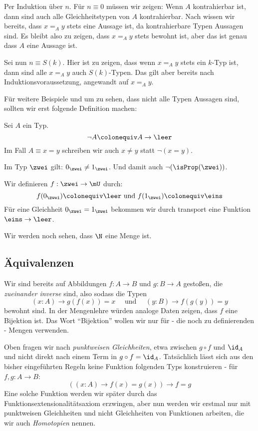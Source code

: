 \begin{beweis}
  Per Induktion über $n$.
  Für $n\equiv 0$ müssen wir zeigen: Wenn $A$ kontrahierbar ist, dann sind auch alle Gleichheitstypen von $A$ kontrahierbar.
  Nach  wissen wir bereits, dass $x=_Ay$ stets eine Aussage ist,
  da kontrahierbare Typen Aussagen sind.
  Es bleibt also zu zeigen, dass $x=_Ay$ stets bewohnt ist, aber das ist genau dass $A$ eine Aussage ist.

  Sei nun $n\equiv S(k)$. Hier ist zu zeigen, dass wenn $x=_Ay$ stets ein $k$-Typ ist,
  dann sind alle $x=_Ay$ auch $S(k)$-Typen. Das gilt aber bereits nach Induktionsvoraussetzung, angewandt auf $x=_Ay$.
\end{beweis}

Für weitere Beispiele und um zu sehen, dass nicht alle Typen Aussagen sind, sollten wir erst folgende Definition machen:

\begin{definition}
  Sei $A$ ein Typ.
  \[
    \neg A\colonequiv A\to\leer
    \]
    Im Fall $A\equiv x=y$ schreiben wir auch $x\neq y$ statt $\neg(x=y)$.
\end{definition}

\begin{bemerkung}
  Im Typ $\zwei$ gilt: $0_\zwei\neq 1_\zwei$. Und damit auch $\neg(\isProp(\zwei))$.
\end{bemerkung}
\begin{beweis}
  Wir definieren $f:\zwei\to\mU$ durch:
  \[
    f(0_\zwei)\colonequiv \leer\text{ und }f(1_\zwei)\colonequiv \eins
    \]
    Für eine Gleichheit $0_\zwei=1_\zwei$ bekommen wir durch transport eine Funktion $\eins\to\leer$.
\end{beweis}

Wir werden noch sehen, dass $\N$ eine Menge ist.

\subsection{Äquivalenzen}

Wir sind bereits auf Abbildungen $f:A\to B$ und $g:B\to A$ gestoßen, die \emph{zueinander inverse} sind, also sodass die Typen
\[
  (x:A)\to g(f(x))=x\quad \text{ und }\quad (y:B)\to f(g(y))=y 
\]
bewohnt sind.
In der Mengenlehre würden analoge Daten zeigen, dass $f$ eine Bijektion ist.
Das Wort ``Bijektion'' wollen wir nur für - die noch zu definierenden - Mengen verwenden.

Oben fragen wir nach \emph{punktweisen Gleichheiten}, etwa zwischen $g\circ f$ und $\id_A$ und
nicht direkt nach einem Term in $g\circ f = \id_A$.
Tatsächlich lässt sich aus den bisher eingeführten Regeln keine Funktion folgenden Typs konstruieren - für $f,g:A\to B$:
\[
  ((x:A)\to f(x)=g(x))\to f=g
\]
Eine solche Funktion werden wir später durch das Funktionsextensionalitätsaxiom erzwingen,
aber nun werden wir erstmal nur mit punktweisen Gleichheiten und nicht Gleichheiten von Funktionen arbeiten, die wir auch \emph{Homotopien} nennen.

